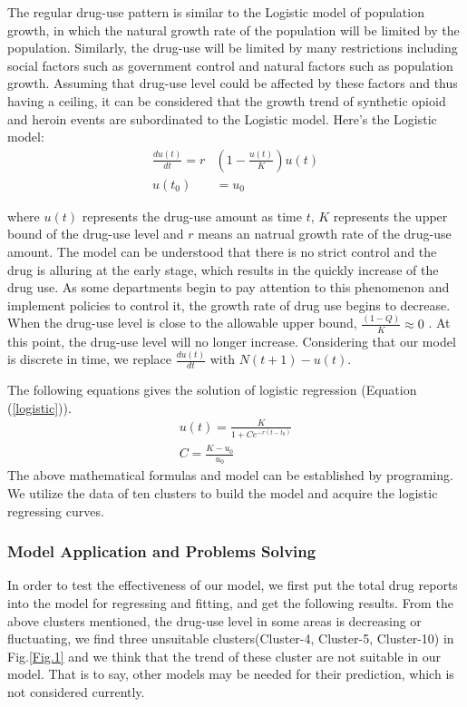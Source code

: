 \documentclass[12pt]{article}
\begin{document}
The regular drug-use pattern is similar to the Logistic model of population growth, in which the natural growth rate of the population will be limited by the population. Similarly, the drug-use will be limited by many restrictions including social factors such as government control and natural factors such as population growth. Assuming that drug-use level could be affected by these factors and thus having a ceiling, it can be considered that the growth trend of synthetic opioid and heroin events are subordinated to the Logistic model. Here's the Logistic model:
\begin{equation}
	\begin{split}
	\frac{du(t)}{dt} = r&(1-\frac{u(t)}{K})u(t) \label{logistic}\\
	u(t_{0}) &= u_{0}
	\end{split}
\end{equation}

where $u(t)$ represents the drug-use amount as time $t$, $K$ represents the upper bound of the drug-use level and $r$ means an natrual growth rate of the drug-use amount. The model can be understood that there is no strict control and the drug is alluring at the early stage, which results in the quickly increase of the drug use. As some departments begin to pay attention to this phenomenon and implement policies to control it, the growth rate of drug use begins to decrease. When the drug-use level is close to the allowable upper bound, $\frac{(1-Q)}{K} \approx 0$ . At this point, the drug-use level will no longer increase. Considering that our model is discrete in time,  we replace $\frac{du(t)}{dt}$ with $N(t+1)-u(t)$.

The following equations gives the solution of logistic regression (Equation (\ref{logistic})).
\begin{gather}
	u(t)=\frac{K}{1+Ce^{-r(t-t_{0})}} \\
	C=\frac{K-u_{0}}{u_{0}} 
\end{gather}
The above mathematical formulas and model can be established by programing. We utilize the data of ten clusters to build the model and acquire the logistic regressing curves.

\subsubsection{Model Application and Problems Solving}
In order to test the effectiveness of our model, we first put the total drug reports into the model for regressing and fitting, and get the following results. From the above clusters mentioned, the drug-use level in some areas is decreasing or fluctuating, we find three unsuitable clusters(Cluster-4, Cluster-5, Cluster-10) in Fig.\ref{Fig.1} and we think that the trend of these cluster are not suitable in our model. That is to say, other models may be needed for their prediction, which is not considered currently.
\end{document}
